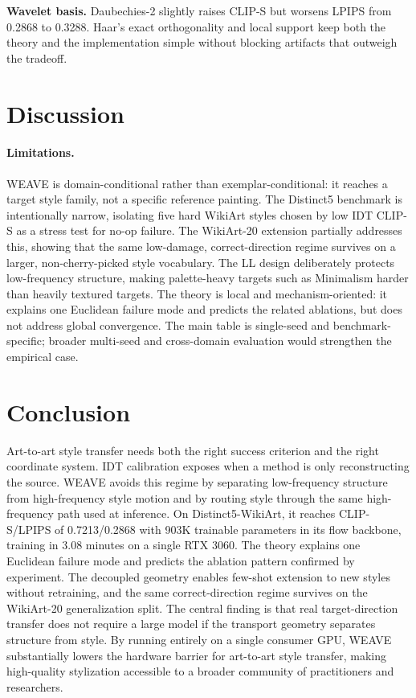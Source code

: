 \documentclass[letterpaper]{article}
\begin{document}
\textbf{Wavelet basis.}
Daubechies-2 slightly raises CLIP-S but worsens LPIPS from 0.2868 to 0.3288.
Haar's exact orthogonality and local support keep both the theory and the implementation simple without blocking artifacts that outweigh the tradeoff.

\section{Discussion}

\paragraph{Limitations.}
WEAVE is domain-conditional rather than exemplar-conditional: it reaches a target style family, not a specific reference painting.
The Distinct5 benchmark is intentionally narrow, isolating five hard WikiArt styles chosen by low IDT CLIP-S as a stress test for no-op failure.
The WikiArt-20 extension partially addresses this, showing that the same low-damage, correct-direction regime survives on a larger, non-cherry-picked style vocabulary.
The LL design deliberately protects low-frequency structure, making palette-heavy targets such as Minimalism harder than heavily textured targets.
The theory is local and mechanism-oriented: it explains one Euclidean failure mode and predicts the related ablations, but does not address global convergence.
The main table is single-seed and benchmark-specific; broader multi-seed and cross-domain evaluation would strengthen the empirical case.

\section{Conclusion}

Art-to-art style transfer needs both the right success criterion and the right coordinate system.
IDT calibration exposes when a method is only reconstructing the source.
WEAVE avoids this regime by separating low-frequency structure from high-frequency style motion and by routing style through the same high-frequency path used at inference.
On Distinct5-WikiArt, it reaches CLIP-S/LPIPS of 0.7213/0.2868 with 903K trainable parameters in its flow backbone, training in 3.08 minutes on a single RTX 3060.
The theory explains one Euclidean failure mode and predicts the ablation pattern confirmed by experiment.
The decoupled geometry enables few-shot extension to new styles without retraining, and the same correct-direction regime survives on the WikiArt-20 generalization split.
The central finding is that real target-direction transfer does not require a large model if the transport geometry separates structure from style.
By running entirely on a single consumer GPU, WEAVE substantially lowers the hardware barrier for art-to-art style transfer, making high-quality stylization accessible to a broader community of practitioners and researchers.
\end{document}
